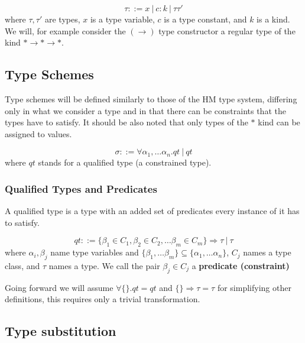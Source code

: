 \begin{defn}[types]
    $$\tau ::= x\ |\ c : k\ |\ \tau \tau'$$
    where $\tau, \tau'$ are types, $x$ is a type variable, $c$ is a type constant, and $k$ is a kind. We will, for example consider the $(\rightarrow)$ type constructor a regular type of the kind $* \rightarrow * \rightarrow *$.
\end{defn}

\subsection{Type Schemes}

Type schemes will be defined similarly to those of the HM type system, differing only in what we consider a type and in that there can be constraints that the types have to satisfy. It should be also noted that only types of the $*$ kind can be assigned to values.

\begin{defn}
    \label{defn:typeSchemes}
    $$\sigma ::= \forall \alpha_1, \dots \alpha_n . qt\ |\ qt$$
    where $qt$ stands for a qualified type (a constrained type).
\end{defn}

\subsubsection{Qualified Types and Predicates}

A qualified type is a type with an added set of predicates every instance of it has to satisfy.

\begin{defn}
    $$qt ::= \{\beta_1 \in C_1, \beta_2 \in C_2, \dots \beta_m \in C_m\} \Rightarrow \tau\ |\ \tau$$
    where $\alpha_i, \beta_j$ name type variables and $\{\beta_1, \dots \beta_m\} \subseteq \{\alpha_1, \dots \alpha_n\}$, $C_j$ names a type class, and $\tau$ names a type. We call the pair $\beta_j \in C_j$ a \textbf{predicate (constraint)} %
\end{defn}

Going forward we will assume $\forall \{\}. qt = qt$ and $\{\} \Rightarrow \tau = \tau$ for simplifying other definitions, this requires only a trivial transformation. %

\subsection{Type substitution}


